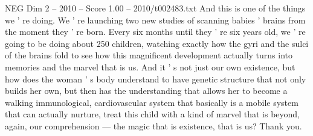 \begin{textsample}{NEG Dim 2 – 2010 – Score 1.00 – 2010/t002483.txt}
And this is one of the things we ' re doing.
We ' re launching two new studies of scanning babies ' brains from the moment they ' re born.
Every six months until they ' re six years old, we ' re going to be doing about 250 children, watching exactly how the gyri and the sulci of the brains fold to see how this magnificent development actually turns into memories and the marvel that is us.
And it ' s not just our own existence, but how does the woman ' s body understand to have genetic structure that not only builds her own, but then has the understanding that allows her to become a walking immunological, cardiovascular system that basically is a mobile system that can actually nurture, treat this child with a kind of marvel that is beyond, again, our comprehension — the magic that is existence, that is us?
Thank you.

\end{textsample}

